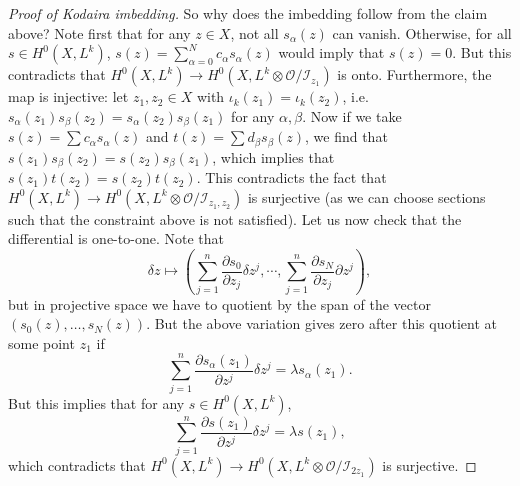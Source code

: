 \documentclass{../mathnotes}
\begin{document}
\begin{proof}[Proof of Kodaira imbedding]
     So why does the imbedding follow from the claim above?
     Note first that for any $z\in X$, not all $s_\alpha(z)$ can vanish. Otherwise, for all $s\in H^0(X,L^k)$,
     $s(z)=\sum_{\alpha=0}^Nc_\alpha s_\alpha(z)$ would imply that $s(z)=0$. But this contradicts that
     $H^0(X,L^k)\to H^0(X,L^k\otimes\mathcal{O}/\mathcal{I}_{z_1})$ is onto.
     Furthermore, the map is injective: let $z_1,z_2\in X$ with $\iota_k(z_1)=\iota_k(z_2)$, i.e.
     $s_\alpha(z_1)s_\beta(z_2)=s_\alpha(z_2)s_\beta(z_1)$ for any $\alpha,\beta$. Now if we take
     $s(z)=\sum c_\alpha s_\alpha(z)$ and $t(z)=\sum d_\beta s_\beta(z)$, we find that
     $s(z_1)s_\beta(z_2)=s(z_2)s_\beta(z_1)$, which implies that $s(z_1)t(z_2)=s(z_2)t(z_2)$.
     This contradicts the fact that $H^0(X,L^k)\to H^0(X,L^k\otimes\mathcal{O}/\mathcal{I}_{z_1,z_2})$
     is surjective (as we can choose sections such that the constraint above is not satisfied).
     Let us now check that the differential is one-to-one. Note that
     \[\delta z\mapsto \left( \sum_{j=1}^n\frac{\partial s_0}{\partial z_j}\delta z^j,\cdots,\sum_{j=1}^n\frac{\partial s_N}{\partial z_j}\partial z^j \right),\]
     but in projective space we have to quotient by the span of the vector $(s_0(z),\ldots,s_N(z))$.
     But the above variation gives zero after this quotient at some point $z_1$ if
     \[\sum_{j=1}^n\frac{\partial s_\alpha(z_1)}{\partial z^j}\delta z^j=\lambda s_\alpha(z_1).\]
     But this implies that for any $s\in H^0(X,L^k)$,
     \[\sum_{j=1}^n\frac{\partial s(z_1)}{\partial z^j}\delta z^j=\lambda s(z_1),\]
     which contradicts that $H^0(X,L^k)\to H^0(X,L^k\otimes \mathcal{O}/\mathcal{I}_{2z_1})$ is surjective.



\end{proof}
\end{document}
